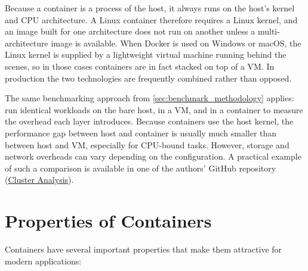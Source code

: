 \begin{tipsblock}
    Because a container is a process of the host, it always runs on the host's kernel and CPU architecture. A Linux container therefore requires a Linux kernel, and an image built for one architecture does not run on another unless a multi-architecture image is available. When Docker is used on Windows or macOS, the Linux kernel is supplied by a lightweight virtual machine running behind the scenes, so in those cases containers are in fact stacked on top of a VM. In production the two technologies are frequently combined rather than opposed.
\end{tipsblock}

The same benchmarking approach from \cref{sec:benchmark_methodology} applies: run identical workloads on the bare host, in a VM, and in a container to measure the overhead each layer introduces. Because containers use the host kernel, the performance gap between host and container is usually much smaller than between host and VM, especially for CPU-bound tasks. However, storage and network overheads can vary depending on the configuration.  A practical example of such a comparison is available in one of the authors' GitHub repository (\href{https://github.com/christianfaccio/cluster_analysis.git}{Cluster Analysis}).

\section{Properties of Containers} \label{sec:container_properties}

Containers have several important properties that make them attractive for modern applications:

\medskip

